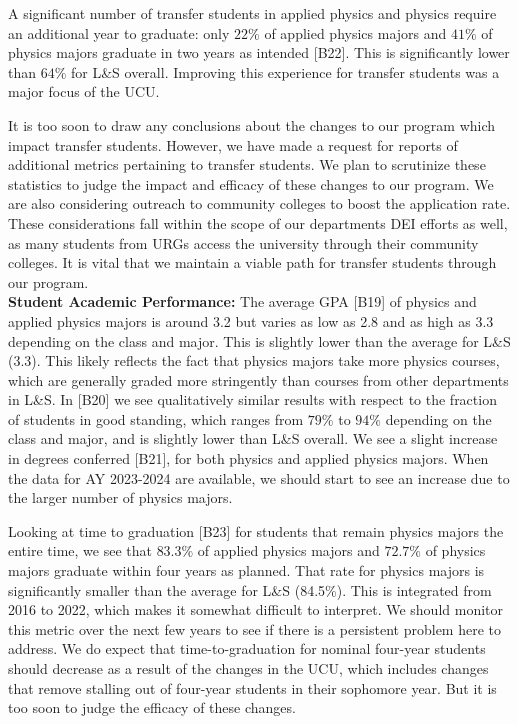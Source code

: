 \documentclass[12pt]{article}
\begin{document}
A significant number of transfer students in applied physics and
physics require an additional year to graduate: only $22\%$ of applied
physics majors and $41\%$ of physics majors graduate in two years as
intended [B22].  This is significantly lower than $64\%$ for L\&S
overall.  Improving this experience for transfer students was a major
focus of the UCU.

It is too soon to draw any conclusions about the changes to our
program which impact transfer students.  However, we have made a
request for reports of additional metrics pertaining to transfer
students.  We plan to scrutinize these statistics to judge the impact
and efficacy of these changes to our program.  We are also considering
outreach to community colleges to boost the application rate.  These
considerations fall within the scope of our departments DEI efforts as
well, as many students from URGs access the university through their
community colleges.  It is vital that we maintain a viable path for
transfer students through our program.\\[3pt]

\noindent
{\bf Student Academic Performance:} The average GPA [B19] of physics
and applied physics majors is around 3.2 but varies as low as 2.8 and
as high as 3.3 depending on the class and major.  This is slightly
lower than the average for L\&S (3.3).  This likely reflects the fact
that physics majors take more physics courses, which are generally
graded more stringently than courses from other departments in L\&S.
In [B20] we see qualitatively similar results with respect to the
fraction of students in good standing, which ranges from $79\%$ to
$94\%$ depending on the class and major, and is slightly lower than
L\&S overall.  We see a slight increase in degrees conferred [B21],
for both physics and applied physics majors.  When the data for AY
2023-2024 are available, we should start to see an increase due to the
larger number of physics majors.

Looking at time to graduation [B23] for students that remain physics
majors the entire time, we see that $83.3\%$ of applied physics majors
and $72.7\%$ of physics majors graduate within four years as planned.
That rate for physics majors is significantly smaller than the average
for L\&S (84.5\%).  This is integrated from 2016 to 2022, which makes
it somewhat difficult to interpret.  We should monitor this metric
over the next few years to see if there is a persistent problem here
to address.  We do expect that time-to-graduation for nominal
four-year students should decrease as a result of the changes in the
UCU, which includes changes that remove stalling out of four-year
students in their sophomore year.  But it is too soon to judge the
efficacy of these changes.\\[3pt]
\end{document}

